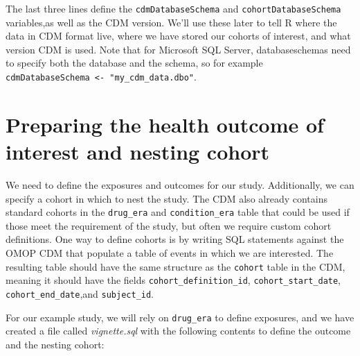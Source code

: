 \documentclass[]{article}
\begin{document}
The last three lines define the \texttt{cdmDatabaseSchema} and
\texttt{cohortDatabaseSchema} variables,as well as the CDM version.
We'll use these later to tell R where the data in CDM format live, where
we have stored our cohorts of interest, and what version CDM is used.
Note that for Microsoft SQL Server, databaseschemas need to specify both
the database and the schema, so for example
\texttt{cdmDatabaseSchema\ \textless{}-\ "my\_cdm\_data.dbo"}.

\hypertarget{preparing-the-health-outcome-of-interest-and-nesting-cohort}{%
\section{Preparing the health outcome of interest and nesting
cohort}\label{preparing-the-health-outcome-of-interest-and-nesting-cohort}}

We need to define the exposures and outcomes for our study.
Additionally, we can specify a cohort in which to nest the study. The
CDM also already contains standard cohorts in the \texttt{drug\_era} and
\texttt{condition\_era} table that could be used if those meet the
requirement of the study, but often we require custom cohort
definitions. One way to define cohorts is by writing SQL statements
against the OMOP CDM that populate a table of events in which we are
interested. The resulting table should have the same structure as the
\texttt{cohort} table in the CDM, meaning it should have the fields
\texttt{cohort\_definition\_id}, \texttt{cohort\_start\_date},
\texttt{cohort\_end\_date},and \texttt{subject\_id}.

For our example study, we will rely on \texttt{drug\_era} to define
exposures, and we have created a file called \emph{vignette.sql} with
the following contents to define the outcome and the nesting cohort:
\end{document}
